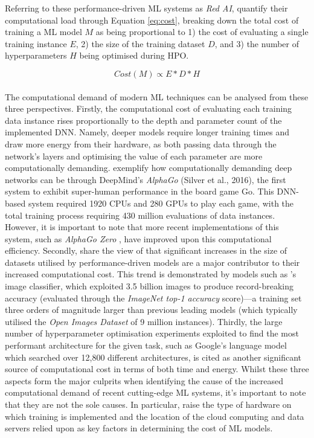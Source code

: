 \documentclass[a4paper, 12pt]{article}
\begin{document}
    Referring to these performance-driven ML systems as \emph{Red AI},  quantify their computational load through Equation \ref{eq:cost}, breaking down the total cost of training a ML model $M$ as being proportional to 1) the cost of evaluating a single training instance $E$, 2) the size of the training dataset $D$, and 3) the number of hyperparameters $H$ being optimised during HPO.

    \begin{equation}
        Cost(M) \propto E * D * H
        \label{eq:cost}
    \end{equation}
    \\
    The computational demand of modern ML techniques can be analysed from these three perspectives. Firstly, the computational cost of evaluating each training data instance rises proportionally to the depth and parameter count of the implemented DNN. Namely, deeper models require longer training times and draw more energy from their hardware, as both passing data through the network's layers and optimising the value of each parameter are more computationally demanding.  exemplify how computationally demanding deep networks can be through DeepMind's \emph{AlphaGo} (Silver et al., 2016), the first system to exhibit super-human performance in the board game Go. This DNN-based system required 1920 CPUs and 280 GPUs to play each game, with the total training process requiring 430 million evaluations of data instances. However, it is important to note that more recent implementations of this system, such as \emph{AlphaGo Zero} \cite{silver-2017}, have improved upon this computational efficiency. Secondly,  share the view of  that significant increases in the size of datasets utilised by performance-driven models are a major contributor to their increased computational cost. This trend is demonstrated by models such as 's image classifier, which exploited 3.5 billion images to produce record-breaking accuracy (evaluated through the \emph{ImageNet top-1 accuracy} score)---a training set three orders of magnitude larger than previous leading models (which typically utilised the \emph{Open Images Dataset} of 9 million instances). Thirdly, the large number of hyperparameter optimisation experiments exploited to find the most performant architecture for the given task, such as Google's language model \cite{cer-2018} which searched over 12,800 different architectures, is cited as another significant source of computational cost in terms of both time and energy. Whilst these three aspects form the major culprits when identifying the cause of the increased computational demand of recent cutting-edge ML systems, it's important to note that they are not the sole causes. In particular,  raise the type of hardware on which training is implemented and the location of the cloud computing and data servers relied upon as key factors in determining the cost of ML models.
\end{document}
